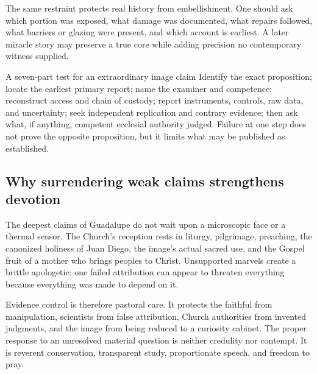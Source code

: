 The same restraint protects real history from embellishment. One should ask which portion was exposed, what damage was documented, what repairs followed, what barriers or glazing were present, and which account is earliest. A later miracle story may preserve a true core while adding precision no contemporary witness supplied.

\begin{studybox}{A seven-part test for an extraordinary image claim}
Identify the exact proposition; locate the earliest primary report; name the examiner and competence; reconstruct access and chain of custody; report instruments, controls, raw data, and uncertainty; seek independent replication and contrary evidence; then ask what, if anything, competent ecclesial authority judged. Failure at one step does not prove the opposite proposition, but it limits what may be published as established.
\end{studybox}

\subsection{Why surrendering weak claims strengthens devotion}

The deepest claims of Guadalupe do not wait upon a microscopic face or a thermal sensor. The Church's reception rests in liturgy, pilgrimage, preaching, the canonized holiness of Juan Diego, the image's actual sacred use, and the Gospel fruit of a mother who brings peoples to Christ. Unsupported marvels create a brittle apologetic: one failed attribution can appear to threaten everything because everything was made to depend on it.

Evidence control is therefore pastoral care. It protects the faithful from manipulation, scientists from false attribution, Church authorities from invented judgments, and the image from being reduced to a curiosity cabinet. The proper response to an unresolved material question is neither credulity nor contempt. It is reverent conservation, transparent study, proportionate speech, and freedom to pray.
